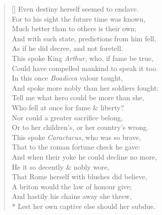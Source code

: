 \documentclass[MAIN]{subfiles}
\begin{document}
\begin{verse}[\versewidth]
Even destiny herself seemed to enslave.\\
For to his sight the future time was known,\\
Much better than to others is their own;\\
And with such state, predictions from him fell,\\
As if he did decree, and not foretell.\\
This spoke King \emph{Arthur}, who, if fame be true,\\ 
Could have compelled mankind to speak it too.\\
In this once \emph{Boadicca} valour taught,\\
And spoke more nobly than her soldiers fought:\\
Tell me what hero could be more than she,\\
Who fell at once for fame \& liberty?\\
Nor could a greater sacrifice belong,\\
Or to her children's, or her country's wrong.\\ 
This spoke \emph{Caractacus}, who was so brave,\\
That to the roman fortune check he gave:\\
And when their yoke he could decline no more,\\
He it so decently \& nobly wore,\\
That {\sc Rome} herself with blushes did believe,\\
A briton would the law of honour give;\\
And hastily his chains away she threw,\\*
Lest her own captive else should her subdue.
\end{verse}
\end{document}
